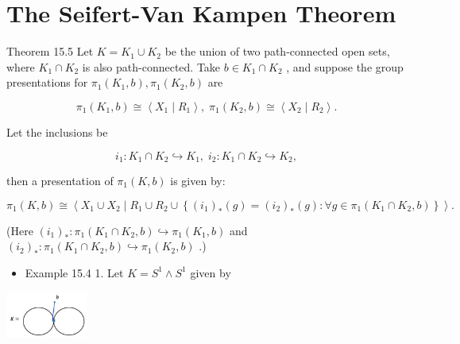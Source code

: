 

\chapter{The Seifert-Van Kampen Theorem}

Theorem 15.5 Let \(K = {K}_{1} \cup  {K}_{2}\) be the union of two path-connected open sets, where \({K}_{1} \cap  {K}_{2}\) is also path-connected. Take \(b \in  {K}_{1} \cap  {K}_{2}\) , and suppose the group presentations for \({\pi }_{1}\left( {{K}_{1},b}\right) ,{\pi }_{1}\left( {{K}_{2},b}\right)\) are

\[
{\pi }_{1}\left( {{K}_{1},b}\right)  \cong  \left\langle  {{X}_{1} \mid  {R}_{1}}\right\rangle  ,\;{\pi }_{1}\left( {{K}_{2},b}\right)  \cong  \left\langle  {{X}_{2} \mid  {R}_{2}}\right\rangle  .
\]

Let the inclusions be

\[
{i}_{1} : {K}_{1} \cap  {K}_{2} \hookrightarrow  {K}_{1},\;{i}_{2} : {K}_{1} \cap  {K}_{2} \hookrightarrow  {K}_{2},
\]

then a presentation of \({\pi }_{1}\left( {K,b}\right)\) is given by:

\[
{\pi }_{1}\left( {K,b}\right)  \cong  \left\langle  {{X}_{1} \cup  {X}_{2} \mid  {R}_{1} \cup  {R}_{2} \cup  \left\{  {{\left( {i}_{1}\right) }_{ * }\left( g\right)  = {\left( {i}_{2}\right) }_{ * }\left( g\right)  : \forall g \in  {\pi }_{1}\left( {{K}_{1} \cap  {K}_{2},b}\right) }\right\}  }\right\rangle  .
\]

(Here \({\left( {i}_{1}\right) }_{ * } : {\pi }_{1}\left( {{K}_{1} \cap  {K}_{2},b}\right)  \hookrightarrow  {\pi }_{1}\left( {{K}_{1},b}\right)\) and \({\left( {i}_{2}\right) }_{ * } : {\pi }_{1}\left( {{K}_{1} \cap  {K}_{2},b}\right)  \hookrightarrow  {\pi }_{1}\left( {{K}_{2},b}\right)\) .)

\begin{itemize}
\item Example 15.4 1. Let \(K = {S}^{1} \land  {S}^{1}\) given by
\end{itemize}

\begin{center}
\includegraphics[max width=0.2\textwidth]{images/bo_d2bcsrref24c73avs720_149_787_508_338_194_0.jpg}
\end{center}
\hspace*{3em} 

